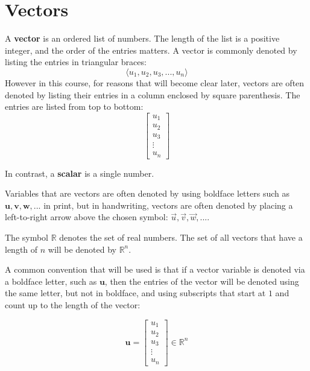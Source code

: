 \documentclass{article}
\begin{document}
\section*{Vectors}

A {\bf vector} is an ordered list of numbers. The length of the list is a positive integer, and the order of the entries matters. A vector is commonly denoted by listing the entries in triangular braces:
\[\langle u_1, u_2, u_3, ..., u_n \rangle\]
However in this course, for reasons that will become clear later, vectors are often denoted by listing their entries in a column enclosed by square parenthesis. The entries are listed from top to bottom:
\[\begin{bmatrix} u_1 \\ u_2 \\ u_3 \\ \vdots \\ u_n \end{bmatrix}\]

In contrast, a {\bf scalar} is a single number.

Variables that are vectors are often denoted by using boldface letters such as \(\mathbf{u}, \mathbf{v}, \mathbf{w}, ...\) in print, but in handwriting, vectors are often denoted by placing a left-to-right arrow above the chosen symbol: \(\vec{u}, \vec{v}, \vec{w}, ...\).


The symbol \(\mathbb{R}\) denotes the set of real numbers. The set of all vectors that have a length of \(n\) will be denoted by \(\mathbb{R}^n\). 

A common convention that will be used is that if a vector variable is denoted via a boldface letter, such as \(\mathbf{u}\), then the entries of the vector will be denoted using the same letter, but not in boldface, and using subscripts that start at \(1\) and count up to the length of the vector:

\[\mathbf{u} = \begin{bmatrix} u_1 \\ u_2 \\ u_3 \\ \vdots \\ u_n \end{bmatrix} \in \mathbb{R}^n\] %
\end{document}
